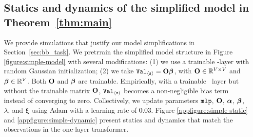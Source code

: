 \subsection{Statics and dynamics of the simplified model in Theorem~\ref{thm:main}}
\label{appsec:train-simple}
We provide simulations that justify our model simplifications in Section~\ref{sec:bb_task}.
We pretrrain the simplified model structure in Figure \ref{figure:simple-model} with several modifications: (1) we use a trainable \mlp-layer with random Gaussian initialization; (2) we take ${\tt Val}_{\texttt{$\langle \texttt{s}\rangle$}}={\mathbf O} \boldsymbol{\beta}$, with ${\mathbf O}\in\mathbb{R}^{V\times V}$ and $\boldsymbol{\beta}\in \mathbb{R}^V$. Both ${\mathbf O}$ and $\boldsymbol{\beta}$ are trainable. Empirically, with a trainable \mlp~layer but without the trainable matrix ${\mathbf O}$, ${\tt Val}_{\texttt{$\langle \texttt{s}\rangle$}}$ becomes a non-negligible bias term instead of converging to zero. Collectively, we update parameters ${\tt mlp}$, ${\mathbf O}$, $\bm{\alpha}$, $\boldsymbol{\beta}$, $\lambda$, and $\bm{\xi}$ using Adam with a learning rate of $0.03$. 
Figure \ref{appfigure:simple-static} and \ref{appfigure:simple-dynamic} present statics and dynamics that match the observations in the one-layer transformer.


